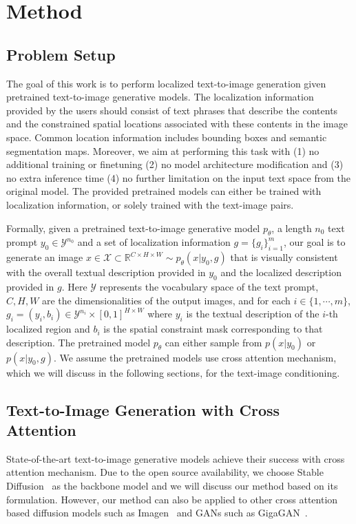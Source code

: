 \section{Method}
\subsection{Problem Setup}
The goal of this work is to perform localized text-to-image generation given pretrained text-to-image generative models. The localization information provided by the users should consist of text phrases that describe the contents and the constrained spatial locations associated with these contents in the image space. Common location information includes bounding boxes and semantic segmentation maps. Moreover, we aim at performing this task with (1) no additional training or finetuning (2) no model architecture modification and (3) no extra inference time (4) no further limitation on the input text space from the original model. The provided pretrained models can either be trained with localization information, or solely trained with the text-image pairs.

Formally, given a pretrained text-to-image generative model $p_\theta$, a length $n_0$ text prompt $y_0 \in \mathcal{Y}^{n_0}$ and a set of localization information $g = \{g_i\}_{i=1}^m$, our goal is to generate an image $x \in \mathcal{X} \subset \mathbb{R}^{C\times H\times W} \sim p_\theta(x|y_0, g)$ that is visually consistent with the overall textual description provided in $y_0$ and the localized description provided in $g$. Here $\mathcal{Y}$ represents the vocabulary space of the text prompt, $C,H,W$ are the dimensionalities of the output images, and for each $i \in \{1,\cdots,m\}$, $g_i = (y_i, b_i) \in \mathcal{Y}^{n_i} \times [0,1]^{H\times W}$ where $y_i$ is the textual description of the $i$-th localized region and $b_i$ is the spatial constraint mask corresponding to that description. 
The pretrained model $p_\theta$ can either sample from %
$p(x|y_0)$ or $p(x|y_0,g)$. We assume the pretrained models use cross attention mechanism, which we will discuss in the following sections, for the text-image conditioning.

\subsection{Text-to-Image Generation with Cross Attention}

State-of-the-art text-to-image generative models achieve their success with cross attention mechanism. 
Due to the open source availability, we choose Stable Diffusion~\citep{stablediffusion} as the backbone model and we will discuss our method based on its formulation. However, our method can also be applied to other cross attention based diffusion models such as Imagen~\citep{imagen} and GANs such as GigaGAN~\citep{gigagan}.

